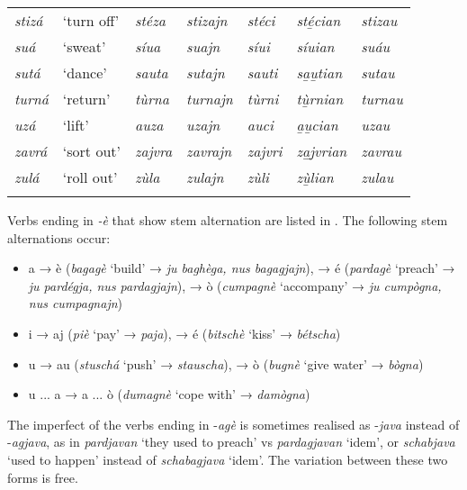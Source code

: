 \begin{sidewaystable}
\begin{tabularx}{\textwidth}{lllllll}
		\textit{stizá} & `turn off' & \textit{stéza} & \textit{stizajn} & \textit{stéci} & \textit{sté̱cian} & \textit{stizau}\\
		\textit{suá} & `sweat' & \textit{síua} & \textit{suajn} & \textit{síui}& \textit{síuian} & \textit{suáu}\\
		\textit{sutá} & `dance' & \textit{sauta} & \textit{sutajn} & \textit{sauti} & \textit{sa̱u̱tian} & \textit{sutau}\\
		\textit{turná} & `return' & \textit{tùrna} & \textit{turnajn} & \textit{tùrni} & \textit{tù̱rnian} & \textit{turnau}\\
		\textit{uzá} & ‘lift’ & \textit{auza} & \textit{uzajn} & \textit{auci} & \textit{a̱u̱cian} & \textit{uzau} \\
		\textit{zavrá} & `sort out' & \textit{zajvra} & \textit{zavrajn} & \textit{zajvri} & \textit{za̱j̱vrian} & \textit{zavrau}\\
		\textit{zulá} & ‘roll out’ & \textit{zùla} & \textit{zulajn} & \textit{zùli} & \textit{zù̱lian} & \textit{zulau} \\
		\lspbottomrule
	\end{tabularx} 
\end{sidewaystable}


Verbs ending in \textit{-è} that show stem alternation are listed in . The following stem alternations occur:

\begin{itemize}
	\item a → è (\textit{bagagè} `build' → \textit{ju baghèga, nus bagagjajn}), → é (\textit{pardagè} `preach' → \textit{ju pardégja, nus pardagjajn}), → ò (\textit{cumpagnè} `accompany' → \textit{ju cumpògna, nus cumpagnajn})
	\item i → aj (\textit{piè} `pay' → \textit{paja}), → é (\textit{bitschè} `kiss' → \textit{bétscha})
	\item u → au (\textit{stuschá} `push' → \textit{stauscha}), → ò (\textit{bugnè} `give water' → \textit{bògna})
	\item u ... a → a ... ò (\textit{dumagnè} `cope with' → \textit{damògna})
	\end{itemize}
	
The imperfect of the verbs ending in -\textit{agè} is sometimes realised as -\textit{java} instead of -\textit{agjava}, as in \textit{pardjavan} `they used to preach' vs \textit{pardagjavan} `idem', or \textit{schabjava} `used to happen' instead of \textit{schabagjava} `idem'. The variation between these two forms is free.
	
